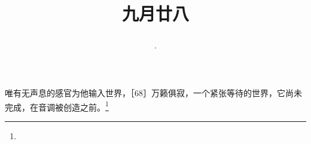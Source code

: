 \title{\date[d=30,m=10,y=2024][year:cn-y,年,month:cn,day:cn,日,·,weekday]·九月廿八 }
唯有无声息的感官为他输入世界，［68］万籁俱寂，一个紧张等待的世界，它尚未完成，在音调被创造之前。\footnote{ }

